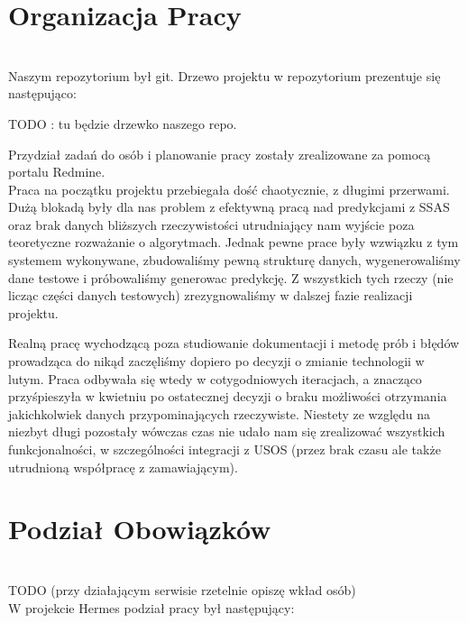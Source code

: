\documentclass[licencjacka]{pracamgr}
\begin{document}
\section{Organizacja Pracy} ~\\


Naszym repozytorium był git. Drzewo projektu w repozytorium prezentuje się następująco:

TODO : tu będzie drzewko naszego repo.

Przydział zadań do osób i planowanie pracy zostały zrealizowane za pomocą portalu Redmine. \\

Praca na początku projektu przebiegała dość chaotycznie, z długimi przerwami. Dużą blokadą były dla nas problem z efektywną pracą nad predykcjami z SSAS oraz brak danych bliższych rzeczywistości utrudniający nam wyjście poza teoretyczne rozważanie o algorytmach. Jednak pewne prace były wzwiązku z tym systemem wykonywane, zbudowaliśmy pewną strukturę danych, wygenerowaliśmy dane testowe i próbowaliśmy generowac predykcję. Z wszystkich tych rzeczy (nie licząc części danych testowych) zrezygnowaliśmy w dalszej fazie realizacji projektu.

Realną pracę wychodzącą poza studiowanie dokumentacji i metodę prób i błędów prowadząca do nikąd zaczęliśmy dopiero po decyzji o zmianie technologii w lutym. Praca odbywała się wtedy w cotygodniowych iteracjach, a znacząco przyśpieszyła w kwietniu po ostatecznej decyzji o braku możliwości otrzymania jakichkolwiek danych przypominających rzeczywiste. Niestety ze względu na niezbyt długi pozostały wówczas czas nie udało nam się zrealizować wszystkich funkcjonalności, w szczególności integracji z USOS (przez brak czasu ale także utrudnioną współpracę z zamawiającym).

\section{Podział Obowiązków} ~\\

TODO (przy działającym serwisie rzetelnie opiszę wkład osób)
~\\ \indent W projekcie Hermes podział pracy był następujący:
\end{document}
